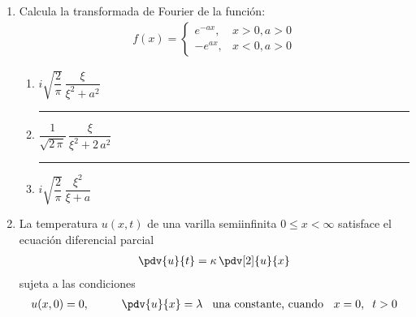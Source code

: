 \begin{enumerate}
\begin{enumerate}[label=1.\alph*)]
\end{enumerate}
\item Calcula la transformada de Fourier de la función:
\begin{align*}
f(x) = \begin{cases}
e^{-a x}, & x > 0, a > 0 \\
-e^{a x}, & x < 0, a > 0
\end{cases}
\end{align*}
\begin{enumerate}[label=2.\alph*)]
\setlength\itemsep{2em}
\item $i \sqrt{\dfrac{2}{\pi}} \, \dfrac{\xi}{\xi^{2} + a^{2}}$ \hrule
\item $\dfrac{1}{\sqrt{2 \, \pi}} \, \dfrac{\xi}{\xi^{2} + 2 \, a^{2}}$\hrule
\item $i \sqrt{\dfrac{2}{\pi}} \, \dfrac{\xi^{2}}{\xi + a}$
\end{enumerate}
\item La temperatura $u (x, t)$ de una varilla semiinfinita
$0 \leq x < \infty$ satisface el ecuación diferencial parcial
\begin{align*}
\pdv{u}{t} = \kappa \, \pdv[2]{u}{x}
\end{align*}
sujeta a las condiciones
\begin{align*}
u(x, 0) = 0, \hspace{1cm} \pdv{u}{x} = \lambda \hspace{0.3cm} \mbox{una constante, cuando } \hspace{0.2cm} x = 0, \hspace{0.2cm} t > 0

\end{align*}
\end{enumerate}
